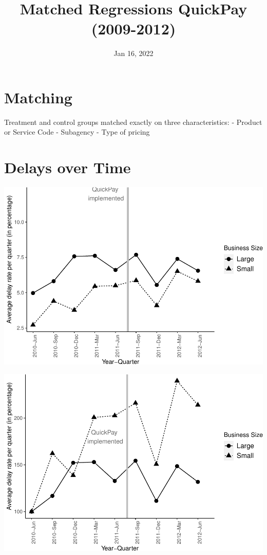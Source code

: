 \documentclass[
]{article}
\title{Matched Regressions QuickPay (2009-2012)}
\author{}
\date{\vspace{-2.5em}Jan 16, 2022}
\begin{document}
\maketitle

\hypertarget{matching}{%
\section{Matching}\label{matching}}

Treatment and control groups matched exactly on three characteristics: -
Product or Service Code - Subagency - Type of pricing

\hypertarget{delays-over-time}{%
\section{Delays over Time}\label{delays-over-time}}

\includegraphics{qp_first_matched_files/figure-latex/plot-1.pdf}

\includegraphics{qp_first_matched_files/figure-latex/normalized_plot-1.pdf}
\end{document}
